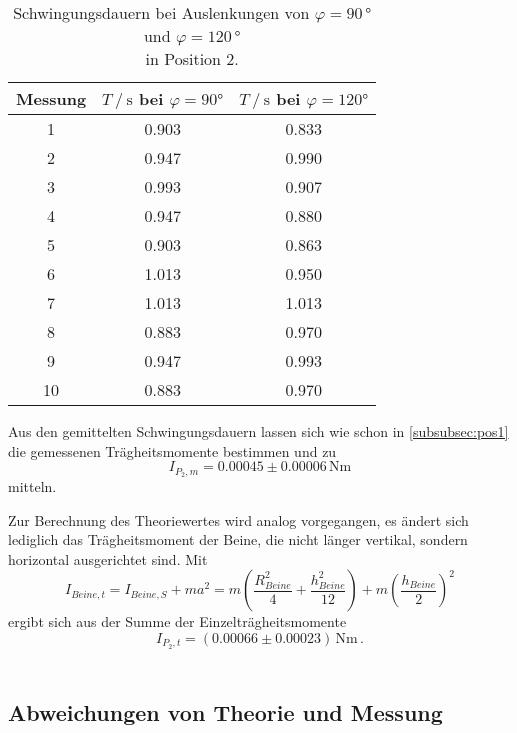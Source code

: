 \begin{table}[H]
  \centering
  \begin{tabular}{S[table-format=2.0] S[table-format=1.3] S}
      \toprule
      {Messung} & {$T \mathbin{/} \unit{\second}$ bei $\varphi = 90 \unit{\degree}$} & {$T \mathbin{/} \unit{\second}$ bei $\varphi = 120 \unit{\degree}$}\\
        & 0.903 & 0.833 \\
      2  & 0.947 & 0.990 \\
      3  & 0.993 & 0.907 \\
      4  & 0.947 & 0.880 \\
      5  & 0.903 & 0.863 \\
      6  & 1.013 & 0.950 \\
      7  & 1.013 & 1.013 \\
      8  & 0.883 & 0.970 \\
      9  & 0.947 & 0.993 \\
      10 & 0.883 & 0.970 \\
      \bottomrule
  \end{tabular}
  \caption{Schwingungsdauern bei Auslenkungen von $\varphi = 90 \, \unit{\degree}$ und $\varphi = 120 \, \unit{\degree}$ \\ in Position 2.}
  \label{tab:Messung_g}
\end{table}

Aus den gemittelten Schwingungsdauern lassen sich wie schon in \autoref{subsubsec:pos1} die gemessenen Trägheitsmomente bestimmen und zu
\begin{equation*}
  I_{P_2,m} = 0.00045 \pm 0.00006 \, \unit{\newton\meter}
\end{equation*}
mitteln.

Zur Berechnung des Theoriewertes wird analog vorgegangen, es ändert sich lediglich das Trägheitsmoment der Beine, die nicht länger vertikal, sondern horizontal ausgerichtet sind.
Mit 
\begin{equation*}
  I_{Beine,t} = I_{Beine,S} + m a^2 = m \left(\frac{R^2_{Beine}}{4} + \frac{h^2_{Beine}}{12} \right) + m \left(\frac{h_{Beine}}{2} \right)^2
\end{equation*}
ergibt sich aus der Summe der Einzelträgheitsmomente
\begin{equation*}
  I_{P_2,t} = (0.00066 \pm 0.00023) \, \unit{\newton\meter} \,.
\end{equation*} \\

\subsection{Abweichungen von Theorie und Messung}

